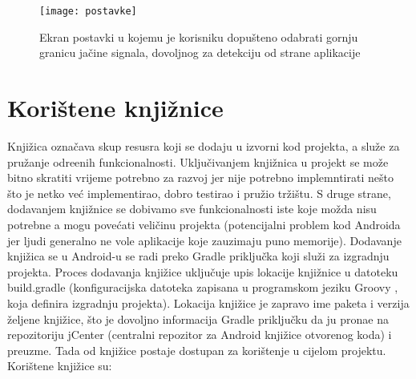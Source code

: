 \begin{figure}[!htbp]
	\begin{center}
 \texttt{[image: postavke]}
 \caption{Ekran postavki u kojemu je korisniku dopu\v{s}teno odabrati gornju granicu ja\v{c}ine signala, dovoljnog za detekciju od strane aplikacije}
 \label{fig:postavke}
	\end{center}
\end{figure}


\section{Kori\v{s}tene knji\v{z}nice}

Knji\v{z}ica ozna\v{c}ava skup resusra koji se dodaju u izvorni kod projekta, a slu\v{z}e za pru\v{z}anje odre\dj enih funkcionalnosti. Uklju\v{c}ivanjem knji\v{z}nica u projekt se mo\v{z}e bitno skratiti vrijeme potrebno za razvoj jer nije potrebno implemntirati ne\v{s}to \v{s}to je netko ve\'{c} implementirao, dobro testirao i pru\v{z}io tr\v{z}i\v{s}tu. S druge strane, dodavanjem knji\v{z}nice se dobivamo sve funkcionalnosti iste koje mo\v{z}da nisu potrebne a mogu pove\'{c}ati veli\v{c}inu projekta (potencijalni problem kod Androida jer ljudi generalno ne vole aplikacije koje zauzimaju puno memorije).
Dodavanje knji\v{z}ica se u Android-u se radi preko Gradle priklju\v{c}ka \cite{gradle} koji slu\v{z}i za izgradnju projekta. Proces dodavanja knji\v{z}ice uklju\v{c}uje upis lokacije knji\v{z}nice u datoteku build.gradle (konfiguracijska datoteka zapisana u programskom jeziku Groovy \cite{groovy}, koja definira izgradnju projekta). Lokacija knji\v{z}ice je zapravo ime paketa i verzija \v{z}eljene knji\v{z}ice, \v{s}to je dovoljno informacija Gradle priklju\v{c}ku da ju prona\dj e na repozitoriju jCenter \cite{jcenter} (centralni repozitor za Android knji\v{z}ice otvorenog koda) i preuzme. Tada od knji\v{z}ice postaje dostupan za kori\v{s}tenje u cijelom projektu.
Kori\v{s}tene knji\v{z}ice su:


